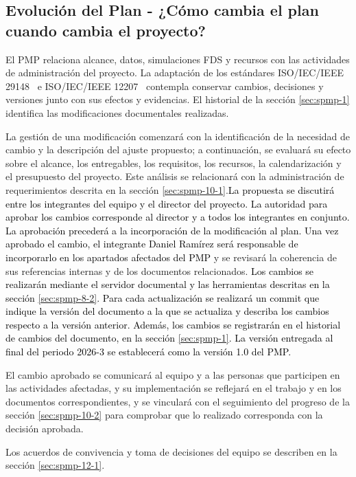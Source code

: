 \subsection{Evolución del Plan - ¿Cómo cambia el plan cuando cambia el proyecto?}\label{sec:spmp-6-6}
El PMP relaciona alcance, datos, simulaciones FDS y recursos con las actividades de administración del proyecto. La adaptación de los estándares ISO/IEC/IEEE 29148~\cite{std29148} e ISO/IEC/IEEE 12207~\cite{std12207} contempla conservar cambios, decisiones y versiones junto con sus efectos y evidencias. El historial de la sección \ref{sec:spmp-1} identifica las modificaciones documentales realizadas.

La gestión de una modificación comenzará con la identificación de la necesidad de cambio y la descripción del ajuste propuesto; a continuación, se evaluará su efecto sobre el alcance, los entregables, los requisitos, los recursos, la calendarización y el presupuesto del proyecto. Este análisis se relacionará con la administración de requerimientos descrita en la sección \ref{sec:spmp-10-1}.\textcolor{black}{La propuesta se discutirá entre los integrantes del equipo y el director del proyecto. La autoridad para aprobar los cambios corresponde al director y a todos los integrantes en conjunto. La aprobación precederá a la incorporación de la modificación al plan. }\textcolor{black}{Una vez aprobado el cambio, el integrante Daniel Ramírez será responsable de incorporarlo en los apartados afectados del PMP} y se revisará la coherencia de sus referencias internas y de los documentos relacionados. \textcolor{black}{Los cambios se realizarán mediante el servidor documental y las herramientas descritas en la sección \ref{sec:spmp-8-2}. Para cada actualización se realizará un commit que indique la versión del documento a la que se actualiza y describa los cambios respecto a la versión anterior. Además, los cambios se registrarán en el historial de cambios del documento, en la sección \ref{sec:spmp-1}. La versión entregada al final del periodo 2026-3 se establecerá como la versión 1.0 del PMP.}

El cambio aprobado se comunicará al equipo y a las personas que participen en las actividades afectadas, y su implementación se reflejará en el trabajo y en los documentos correspondientes, y se vinculará con el seguimiento del progreso de la sección \ref{sec:spmp-10-2} para comprobar que lo realizado corresponda con la decisión aprobada.

Los acuerdos de convivencia y toma de decisiones del equipo se describen en la sección \ref{sec:spmp-12-1}.
